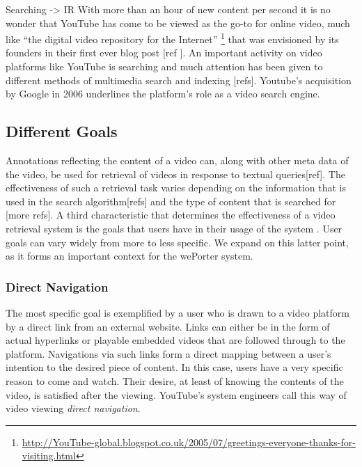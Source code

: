 Searching -> IR
With more than an hour of new content per second it is no wonder that YouTube has come to be viewed as the go-to for online video, much like ``the digital video repository for the Internet'' \footnote{\url{http://YouTube-global.blogspot.co.uk/2005/07/greetings-everyone-thanks-for-visiting.html}} that was envisioned by its founders in their first ever blog post [ref ]. An important activity on video platforms like YouTube is searching and much attention has been given to different methods of multimedia search and indexing [refs]. Youtube's acquisition by Google in 2006 underlines the platform's role as a video search engine. 


\subsection{Different Goals}
Annotations reflecting the content of a video can, along with other meta data of the video, be used for retrieval of videos in response to textual queries[ref]. The effectiveness of such a retrieval task varies depending on the information that is used in the search algorithm[refs] and the type of content that is searched for \cite{Hollink:2005ei}[more refs]. A third characteristic that determines the effectiveness of a video retrieval system is the goals that users have in their usage of the system \cite{Hollink:2005ei}. User goals can vary widely from more to less specific\cite{Davidson:2010tu}. We expand on this latter point, as it forms an important context for the wePorter system.

\subsubsection{Direct Navigation}
The most specific goal is exemplified by a user who is drawn to a video platform by a direct link from an external website. Links can either be in the form of actual hyperlinks or playable embedded videos that are followed through to the platform. Navigations via such links form a direct mapping between a user's intention to the desired piece of content. In this case, users have a very specific reason to come and watch. Their desire, at least of knowing the contents of the video, is satisfied after the viewing. YouTube's system engineers call this way of video viewing \emph{direct navigation}\cite{Davidson:2010tu}.

